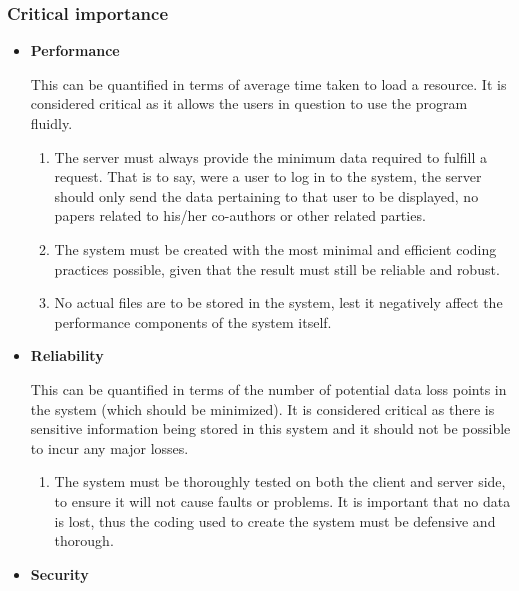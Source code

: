 \documentclass[hidelinks,a4paper,12pt]{article}
\begin{document}
			\subsubsection{Critical importance}
			\begin{itemize}
				\item \textbf{Performance}
				
				This can be quantified in terms of average time taken to load a resource. It is considered critical as it allows the users in question to use the program fluidly.
				\begin{enumerate}
					\item The server must always provide the minimum data required to fulfill a request. That is to say, were a user to log in to the system, the server should only send the data pertaining to that user to be displayed, no papers related to his/her co-authors or other related parties. 
					\item The system must be created with the most minimal and efficient coding practices possible, given that the result must still be reliable and robust.
					\item No actual files are to be stored in the system, lest it negatively affect the performance components of the system itself.
				\end{enumerate}
				\item \textbf{Reliability}
				
				This can be quantified in terms of the number of potential data loss points in the system (which should be minimized). It is considered critical as there is sensitive information being stored in this system and it should not be possible to incur any major losses.
				\begin{enumerate}
					\item The system must be thoroughly tested on both the client and server side, to ensure it will not cause faults or problems. It is important that no data is lost, thus the coding used to create the system must be defensive and thorough.
				\end{enumerate}
				\item \textbf{Security}
				

\end{itemize}
\end{document}
